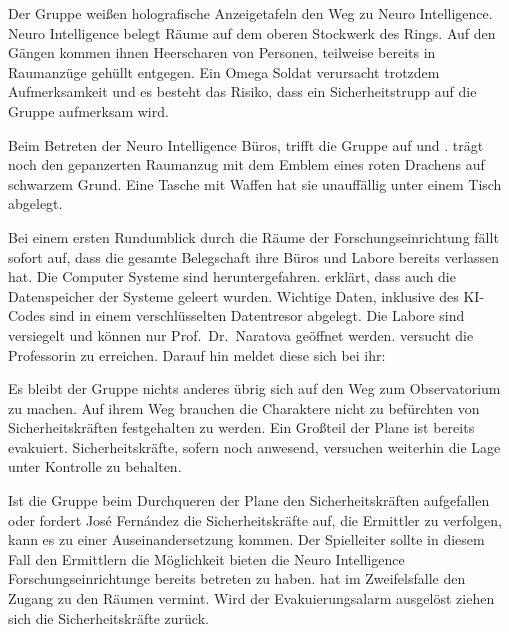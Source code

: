 Der Gruppe weißen holografische Anzeigetafeln den Weg zu Neuro Intelligence. Neuro Intelligence belegt Räume auf dem oberen Stockwerk des Rings. Auf den Gängen kommen ihnen Heerscharen von Personen, teilweise bereits in Raumanzüge gehüllt entgegen. Ein Omega Soldat verursacht trotzdem Aufmerksamkeit und es besteht das Risiko, dass ein Sicherheitstrupp auf die Gruppe aufmerksam wird.

Beim Betreten der Neuro Intelligence Büros, trifft die Gruppe auf \xl{} und \ml{}. \xl{} trägt noch den gepanzerten Raumanzug mit dem Emblem eines roten Drachens auf schwarzem Grund. Eine Tasche mit Waffen hat sie unauffällig unter einem Tisch abgelegt. 

Bei einem ersten Rundumblick durch die Räume der Forschungseinrichtung fällt sofort auf, dass die gesamte Belegschaft ihre Büros und Labore bereits verlassen hat. Die Computer Systeme sind heruntergefahren. \ml{} erklärt, dass auch die Datenspeicher der Systeme geleert wurden. Wichtige Daten, inklusive des KI-Codes sind in einem verschlüsselten Datentresor abgelegt. Die Labore sind versiegelt und können nur Prof.~Dr.~Naratova geöffnet werden. \ml{} versucht die Professorin zu erreichen. Darauf hin meldet diese sich bei ihr:


Es bleibt der Gruppe nichts anderes übrig sich auf den Weg zum Observatorium zu machen. Auf ihrem Weg brauchen die Charaktere nicht zu befürchten von Sicherheitskräften festgehalten zu werden. Ein Großteil der Plane ist bereits evakuiert. Sicherheitskräfte, sofern noch anwesend, versuchen weiterhin die Lage unter Kontrolle zu behalten.

\begin{remarks}
    Ist die Gruppe beim Durchqueren der Plane den Sicherheitskräften aufgefallen oder fordert Jos\'e Fern\'andez die Sicherheitskräfte auf, die Ermittler zu verfolgen, kann es zu einer Auseinandersetzung kommen. Der Spielleiter sollte in diesem Fall den Ermittlern die Möglichkeit bieten die Neuro Intelligence Forschungseinrichtunge bereits betreten zu haben. \xl{} hat im Zweifelsfalle den Zugang zu den Räumen vermint. Wird der Evakuierungsalarm ausgelöst ziehen sich die Sicherheitskräfte zurück.
\end{remarks}
